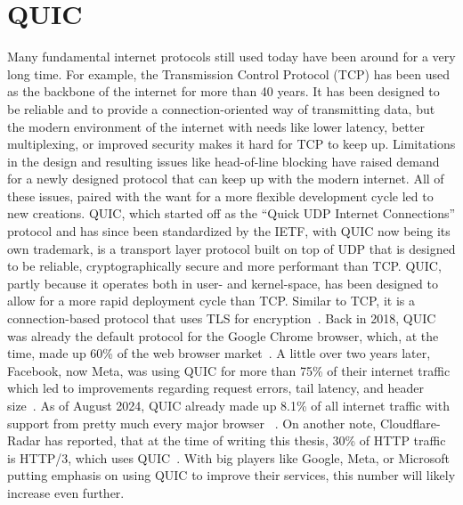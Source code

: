 \section{QUIC}\label{sec:quic_bg}
Many fundamental internet protocols still used today have been around for 
a very long time.
For example, the Transmission Control Protocol (TCP) has been used as the backbone
of the internet for more than 40 years.
It has been designed to be reliable and to provide a connection-oriented
way of transmitting data, but the modern environment of the internet with
needs like lower latency, better multiplexing, or improved security makes it 
hard for TCP to keep up.
Limitations in the design and resulting issues like head-of-line blocking
have raised demand for a newly designed protocol that can keep up with the
modern internet. %
All of these issues, paired with the want for a more flexible development cycle
led to new creations.
QUIC, which started off as the ``Quick UDP Internet Connections'' protocol and has 
since been standardized by the IETF, with QUIC now being its own trademark, is a 
transport layer protocol built on top of UDP that is designed to be reliable, 
cryptographically secure and more performant than TCP\@.
QUIC, partly because it operates both in user- and kernel-space, has been designed to allow for a 
more rapid deployment cycle than TCP\@.
Similar to TCP, it is a connection-based protocol that uses TLS for encryption~\parencite{quic-explained}.
Back in 2018, QUIC was already the default protocol for the Google Chrome browser, which,
at the time, made up 60\% of the web browser market~\parencite{google-quic-usage}.
A little over two years later, Facebook, now Meta, was using QUIC for more than 75\% of 
their internet traffic which led to improvements regarding
request errors, tail latency, and header size~\parencite{facebook-quic-usage}.
As of August 2024, QUIC already made up 8.1\% of all internet traffic %
with support from pretty much every major browser
~\parencite{internet-quic-usage, article-quic-usage}.
On another note, Cloudflare-Radar has reported, that at the time of writing this thesis, 
30\% of HTTP traffic is HTTP/3, which uses QUIC~\parencite{cloudflare-radar}.
With big players like Google, Meta, or Microsoft putting emphasis on
using QUIC to improve their services, this number will likely increase even further.

